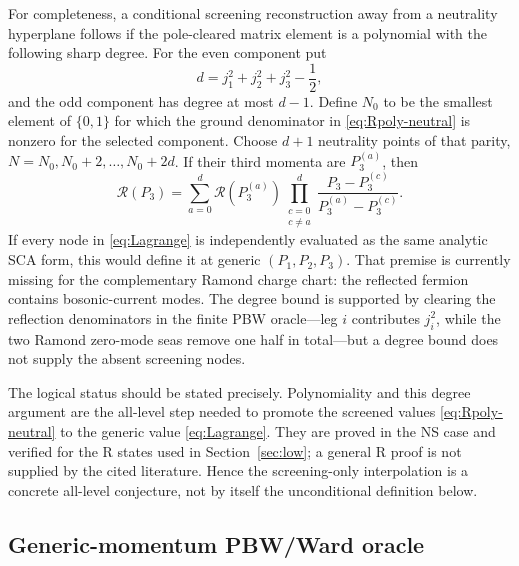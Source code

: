 \documentclass[11pt]{article}
\newcommand{\cR}{\mathcal R}
\begin{document}
For completeness, a conditional screening reconstruction away from a
neutrality hyperplane follows if the pole-cleared matrix element is a
polynomial with the following sharp degree.  For the even component put
\begin{equation}
 d=j_1^2+j_2^2+j_3^2-\frac12,
 \label{eq:degree}
\end{equation}
and the odd component has degree at most $d-1$.  Define $N_0$ to be the
smallest element of $\{0,1\}$ for which the ground denominator in
\eqref{eq:Rpoly-neutral} is nonzero for the selected component.  Choose
$d+1$ neutrality points of that parity,
$N=N_0,N_0+2,\ldots,N_0+2d$.  If their third momenta are
$P_3^{(a)}$, then
\begin{equation}
 \cR(P_3)=\sum_{a=0}^{d}\cR(P_3^{(a)})
 \prod_{\substack{c=0\\c\ne a}}^d
 \frac{P_3-P_3^{(c)}}{P_3^{(a)}-P_3^{(c)}}.
 \label{eq:Lagrange}
\end{equation}
If every node in \eqref{eq:Lagrange} is independently evaluated as the same
analytic SCA form, this would define it at generic
$(P_1,P_2,P_3)$.  That premise is currently missing for the complementary
Ramond charge chart: the reflected fermion contains bosonic-current modes.
The degree bound is supported by clearing the reflection denominators in
the finite PBW oracle---leg $i$ contributes $j_i^2$, while the two Ramond
zero-mode seas remove one half in total---but a degree bound does not
supply the absent screening nodes.

The logical status should be stated precisely.  Polynomiality and this
degree argument are the all-level step needed to promote the screened
values \eqref{eq:Rpoly-neutral} to the generic value \eqref{eq:Lagrange}.
They are proved in the NS case and verified for the R states used in
Section~\ref{sec:low}; a general R proof is not supplied by the cited
literature.  Hence the screening-only interpolation is a concrete
all-level conjecture, not by itself the unconditional definition below.

\subsection{Generic-momentum PBW/Ward oracle}
\end{document}
